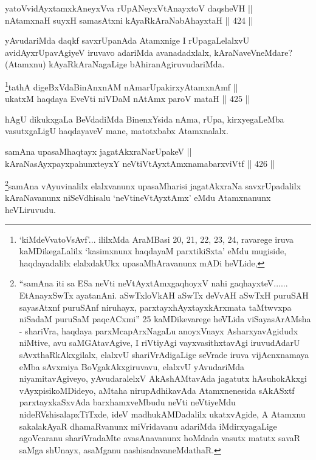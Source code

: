 \begin{shl}
yatoV\s vidAyxtamxkAneyxVva rUpANeyxVtAnayxtoV daqsheVH || \\
nA\s \s tamxnaH suyxH samasAtxni kAyaRkAraNabAhayxtaH \hfill || 424 || 
\end{shl}

\begin{artha}
yAvudariMda daqkf savxrUpanAda Atamxnige I rUpagaLelalxvU
avidAyxrUpavAgiyeV iruvavo adariMda avanadadxlalx, kAraNaveVneMdare?
(Atamxnu) kAyaRkAraNagaLige bAhiranAgiruvudariMda.
\end{artha}


\begin{shl}
\footnote{`kiMdeVvatoV\s sAvf'... ililxMda AraMBasi 20, 21, 22, 23, 24, ravarege iruva kaMDikegaLalilx `kasimxnunx haqdayaM parxtikiSxta' eMdu mugiside, haqdayadalilx elalxdakUkx upasaMhAravanunx mADi heVLide,}tathA digeBxVdaBinAnxnAM nAmarUpakirxyAtamxnAmf || \\
ukatxM haqdaya EveVti niVDaM nA\s \s tAmx paroV mataH \hfill || 425 ||  
\end{shl}

\begin{artha}
hAgU dikukxgaLa BeVdadiMda BinenxYsida nAma, rUpa,
kirxyegaLeMba vasutxgaLigU haqdayaveV mane, matotxbabx Atamxnalalx.
\end{artha}


\begin{shl}
samAna upasaMhaqtayx jagatAkxraNarUpakeV || \\
kAraNasAyxpayxpahunxteyxY neVtiVtAyxtAmxnamabarxviVtf \hfill || 426 ||  
\end{shl}

\begin{artha}
\footnote{``samAna iti sa ESa neVti neVtAyxtAmxgaqhoyxV nahi gaqhayxteV...... EtAnayxSwTx ayatanAni. aSwTxloVkAH aSwTx deVvAH aSwTxH puruSAH sayasAtxnf puruSAnf niruhayx, parxtayxhAyxtayxkArxmata taMtwvxpa niSadaM puruSaM paqcACxmi'' 25 kaMDikevarege heVLida viSayasArAMsha - shariVra, haqdaya parxMcapArxNagaLu anoyxVnayx AsharxyavAgidudx niMtive, avu saMGAtavAgive, I riVtiyAgi vayxvasithxtavAgi iruvudAdarU sAvxthaRkAkxgilalx, elalxvU shariVrAdigaLige seVrade iruva vijAcnxnamaya eMba sAvxmiya BoVgakAkxgiruvavu, elalxvU yAvudariMda niyamitavAgiveyo, yAvudaralelxV AkAshAMtavAda jagatutx hAsuhokAkxgi vAyxpisikoMDideyo, aMtaha nirupAdhikavAda Atamxnenesida sAkASxtf parxtayxkaSxvAda barxhamxveMbudu neVti neVtiyeMdu nideRVshisalapxTiTxde, ideV madhukAMDadalilx ukatxvAgide, A Atamxnu sakalakAyaR dhamaRvanunx miVridavanu adariMda iMdirxyagaLige agoVcaranu shariVradaMte avasAnavanunx hoMdada vasutx matutx savaR saMga shUnayx, asaMganu nashisadavaneMdathaR.}samAna vAyuvinalilx elalxvanunx upasaMharisi jagatAkxraNa savxrUpadalilx kAraNavanunx niSeVdhisalu `neVtineVtAyxtAmx' eMdu Atamxnanunx heVLiruvudu.
\end{artha}


